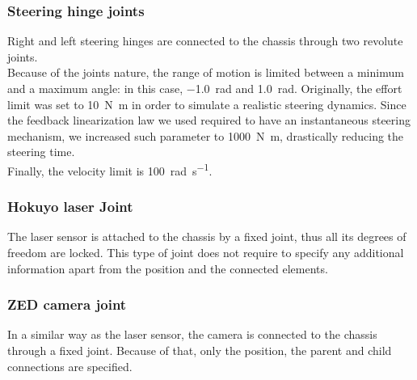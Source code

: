 \subsubsection{Steering hinge joints}
Right and left steering hinges are connected to the chassis through two revolute joints. \\
Because of the joints nature, the range of motion is limited between a minimum and a maximum angle:
in this case, \SI{-1.0}{\radian} and \SI{1.0}{\radian}.
Originally, the effort limit was set to \SI[inter-unit-product =\ensuremath{\cdot}]{10}{\newton\metre} in order to simulate
a realistic steering dynamics. Since the feedback linearization law we used required to have an instantaneous steering 
mechanism, we increased such parameter to \SI[inter-unit-product =\ensuremath{\cdot}]{1000}{\newton\metre}, drastically 
reducing the steering time. \\
Finally, the velocity limit is \SI[per-mode = symbol]{100}{\radian \per \second}.

\subsubsection{Hokuyo laser Joint}
The laser sensor is attached to the chassis by a fixed joint, thus all its degrees of freedom are locked. This type 
of joint does not require to specify any additional information apart from the position and the connected elements.

\subsubsection{ZED camera joint}
In a similar way as the laser sensor, the camera is connected to the chassis through a fixed joint.
Because of that, only the position, the parent and child connections are specified.

